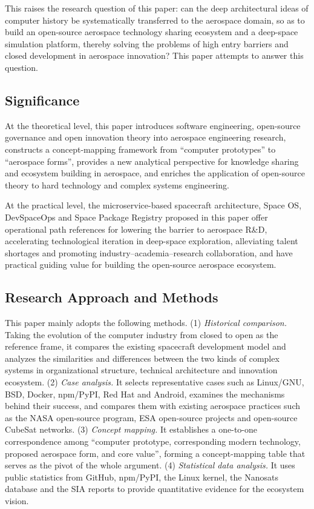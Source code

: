 \documentclass[11pt]{article}
\begin{document}
This raises the research question of this paper: can the deep architectural ideas of computer history be systematically transferred to the aerospace domain, so as to build an open-source aerospace technology sharing ecosystem and a deep-space simulation platform, thereby solving the problems of high entry barriers and closed development in aerospace innovation? This paper attempts to answer this question.

\subsection{Significance}
At the theoretical level, this paper introduces software engineering, open-source governance and open innovation theory into aerospace engineering research, constructs a concept-mapping framework from ``computer prototypes'' to ``aerospace forms'', provides a new analytical perspective for knowledge sharing and ecosystem building in aerospace, and enriches the application of open-source theory to hard technology and complex systems engineering.

At the practical level, the microservice-based spacecraft architecture, Space OS, DevSpaceOps and Space Package Registry proposed in this paper offer operational path references for lowering the barrier to aerospace R\&D, accelerating technological iteration in deep-space exploration, alleviating talent shortages and promoting industry--academia--research collaboration, and have practical guiding value for building the open-source aerospace ecosystem.

\subsection{Research Approach and Methods}
This paper mainly adopts the following methods. (1) \emph{Historical comparison.} Taking the evolution of the computer industry from closed to open as the reference frame, it compares the existing spacecraft development model and analyzes the similarities and differences between the two kinds of complex systems in organizational structure, technical architecture and innovation ecosystem. (2) \emph{Case analysis.} It selects representative cases such as Linux/GNU, BSD, Docker, npm/PyPI, Red Hat and Android, examines the mechanisms behind their success, and compares them with existing aerospace practices such as the NASA open-source program, ESA open-source projects and open-source CubeSat networks. (3) \emph{Concept mapping.} It establishes a one-to-one correspondence among ``computer prototype, corresponding modern technology, proposed aerospace form, and core value'', forming a concept-mapping table that serves as the pivot of the whole argument. (4) \emph{Statistical data analysis.} It uses public statistics from GitHub, npm/PyPI, the Linux kernel, the Nanosats database and the SIA reports to provide quantitative evidence for the ecosystem vision.
\end{document}

